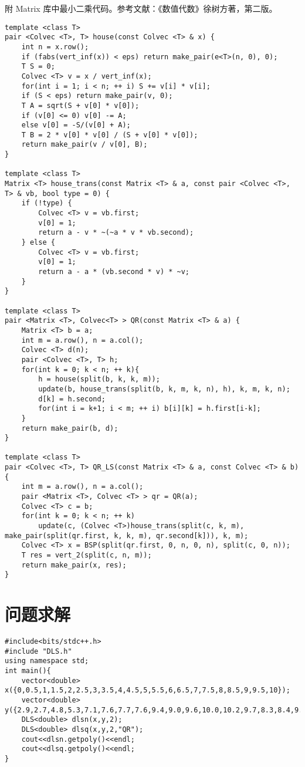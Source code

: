 \documentclass{ctexart}
\begin{document}
附 Matrix 库中最小二乘代码。参考文献：《数值代数》徐树方著，第二版。

\begin{verbatim}
template <class T>
pair <Colvec <T>, T> house(const Colvec <T> & x) {
    int n = x.row();
    if (fabs(vert_inf(x)) < eps) return make_pair(e<T>(n, 0), 0);
    T S = 0;
    Colvec <T> v = x / vert_inf(x);
    for(int i = 1; i < n; ++ i) S += v[i] * v[i];
    if (S < eps) return make_pair(v, 0);
    T A = sqrt(S + v[0] * v[0]);
    if (v[0] <= 0) v[0] -= A;
    else v[0] = -S/(v[0] + A);
    T B = 2 * v[0] * v[0] / (S + v[0] * v[0]);
    return make_pair(v / v[0], B);
}

template <class T>
Matrix <T> house_trans(const Matrix <T> & a, const pair <Colvec <T>, T> & vb, bool type = 0) {
    if (!type) {
        Colvec <T> v = vb.first;
        v[0] = 1;
        return a - v * ~(~a * v * vb.second);
    } else {
        Colvec <T> v = vb.first;
        v[0] = 1;
        return a - a * (vb.second * v) * ~v;
    }
}

template <class T>
pair <Matrix <T>, Colvec<T> > QR(const Matrix <T> & a) {
    Matrix <T> b = a;
    int m = a.row(), n = a.col();
    Colvec <T> d(n);
    pair <Colvec <T>, T> h;
    for(int k = 0; k < n; ++ k){
        h = house(split(b, k, k, m));
        update(b, house_trans(split(b, k, m, k, n), h), k, m, k, n);
        d[k] = h.second;
        for(int i = k+1; i < m; ++ i) b[i][k] = h.first[i-k];
    }
    return make_pair(b, d);
}

template <class T>
pair <Colvec <T>, T> QR_LS(const Matrix <T> & a, const Colvec <T> & b) {
    int m = a.row(), n = a.col();
    pair <Matrix <T>, Colvec <T> > qr = QR(a);
    Colvec <T> c = b;
    for(int k = 0; k < n; ++ k)
        update(c, (Colvec <T>)house_trans(split(c, k, m), make_pair(split(qr.first, k, k, m), qr.second[k])), k, m);
    Colvec <T> x = BSP(split(qr.first, 0, n, 0, n), split(c, 0, n));
    T res = vert_2(split(c, n, m));
    return make_pair(x, res);
}
\end{verbatim}

\section{问题求解}

\begin{verbatim}
#include<bits/stdc++.h>
#include "DLS.h"
using namespace std;
int main(){
    vector<double> x({0,0.5,1,1.5,2,2.5,3,3.5,4,4.5,5,5.5,6,6.5,7,7.5,8,8.5,9,9.5,10});
    vector<double> y({2.9,2.7,4.8,5.3,7.1,7.6,7.7,7.6,9.4,9.0,9.6,10.0,10.2,9.7,8.3,8.4,9.0,8.3,6.6,6.7,4.1});
    DLS<double> dlsn(x,y,2);
    DLS<double> dlsq(x,y,2,"QR");
    cout<<dlsn.getpoly()<<endl;
    cout<<dlsq.getpoly()<<endl;
}
\end{verbatim}
\end{document}
